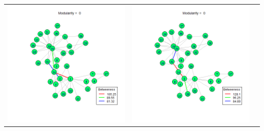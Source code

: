 \documentclass[letterpaper,11pt]{report}
\begin{document}
\begin{savenotes}
\begin{table}[htbp]
\begin{tabular}{ccc}
			\includegraphics[scale=0.28]{karateClub-community-0005.png} & 
			\includegraphics[scale=0.28]{karateClub-community-0006.png} \\

\end{tabular}
\end{table}
\end{savenotes}
\end{document}
